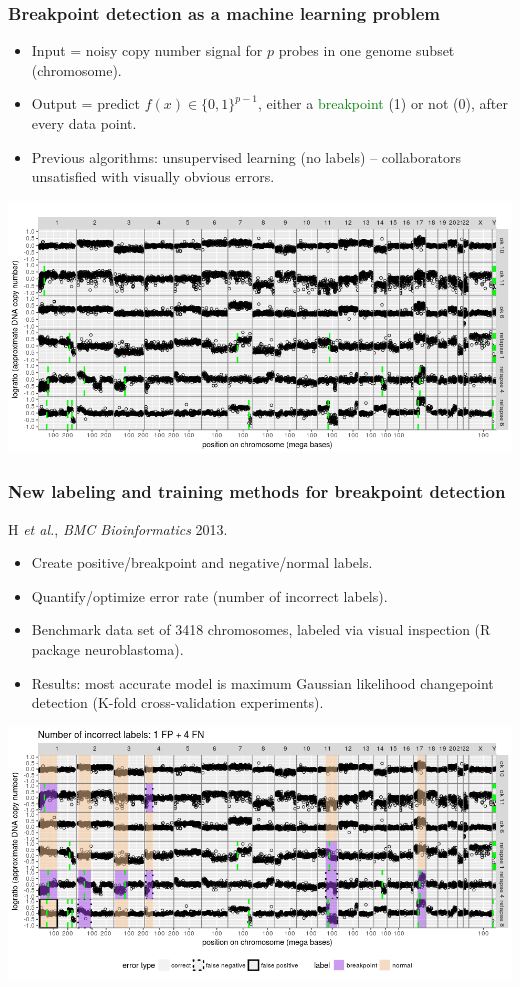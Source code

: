 \documentclass{beamer}
\begin{document}
\begin{frame}
  \frametitle{Breakpoint detection as a machine learning problem}
  
  \begin{itemize}
  \item Input = noisy copy number signal for $p$ probes in one genome
    subset (chromosome).
  \item Output = predict $f(x)\in\{0,1\}^{p-1}$, either a
    \textcolor{green}{breakpoint} (1) or not (0),
    after every data point.
  \item Previous algorithms: unsupervised learning (no labels) --
    collaborators unsatisfied with visually obvious errors.
  \end{itemize}

  \includegraphics[width=\textwidth]{neuroblastoma-ok-relapse-pred}
\end{frame}

\begin{frame}
  \frametitle{New labeling and training methods for breakpoint detection}

  H {\it et al.}, {\it BMC Bioinformatics} 2013.
  \begin{itemize}
  \item Create positive/breakpoint and negative/normal labels.
  \item Quantify/optimize error rate (number of incorrect labels).
  \item Benchmark data set of 3418 chromosomes,
    labeled via visual inspection (R package neuroblastoma).
  \item Results: most accurate model is maximum Gaussian likelihood 
    changepoint detection (K-fold cross-validation experiments).
  \end{itemize}

  \includegraphics[width=\textwidth]{neuroblastoma-ok-relapse-supervised}

\end{frame}
\end{document}

